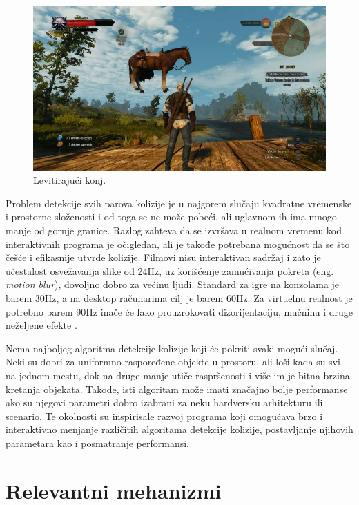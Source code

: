 \documentclass[12pt,oneside]{memoir}
\begin{document}
\begin{figure}[h!]
	\centering
	\includegraphics[scale=0.54]{horse.png}
	\caption{Levitirajući konj.}
	\label{fig:horse}
\end{figure}

Problem detekcije svih parova kolizije je u najgorem slučaju kvadratne vremenske i prostorne složenosti i od toga se ne može pobeći,
ali uglavnom ih ima mnogo manje od gornje granice.
Razlog zahteva da se izvršava u realnom vremenu kod interaktivnih programa je očigledan, ali je takođe
potrebana mogućnost da se što češće i efikasnije utvrde kolizije. Filmovi nisu interaktivan sadržaj i zato
je učestalost osvežavanja slike od 24Hz, uz korišćenje zamućivanja pokreta (eng. {\em motion blur}),
dovoljno dobro za većinu ljudi. Standard za igre na konzolama je barem 30Hz, a na desktop računarima 
cilj je barem 60Hz. Za virtuelnu realnost je potrebno barem 90Hz inače će lako prouzrokovati dizorijentaciju, mučninu i druge
neželjene efekte \cite{importance}.

Nema najboljeg algoritma detekcije kolizije koji će pokriti svaki mogući slučaj. 
Neki su dobri za uniformno raspoređene objekte u prostoru, ali loši kada su svi na jednom mestu, 
dok na druge manje utiče raspršenosti i više im je bitna brzina kretanja objekata.
Takođe, isti algoritam može imati značajno bolje performanse ako su njegovi parametri dobro 
izabrani za neku hardversku arhitekturu ili scenario. 
Te okolnosti su inspirisale razvoj programa koji omogućava brzo i interaktivno menjanje različitih
algoritama detekcije kolizije, postavljanje njihovih parametara kao i posmatranje performansi.

\chapter{Relevantni mehanizmi}
\label{sec:karakteristike}
\end{document}

